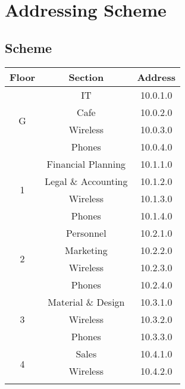 \chapter{Addressing Scheme}
\section{Scheme}
\begin{table}[H]
    \centering
    \begin{tabular}{|c|cc|}
    \hline
    Floor              & \multicolumn{1}{c|}{Section} & Address  \\ \hline
    \multirow{4}{*}{G} & IT                           & 10.0.1.0 \\ \cline{2-3} 
                       & Cafe                         & 10.0.2.0 \\ \cline{2-3} 
                       & Wireless                     & 10.0.3.0 \\ \cline{2-3} 
                       & Phones                       & 10.0.4.0 \\ \hline
    \multirow{4}{*}{1} & Financial Planning           & 10.1.1.0 \\ \cline{2-3} 
                       & Legal \& Accounting          & 10.1.2.0 \\ \cline{2-3} 
                       & Wireless                     & 10.1.3.0 \\ \cline{2-3} 
                       & Phones                       & 10.1.4.0 \\ \hline
    \multirow{4}{*}{2} & Personnel                    & 10.2.1.0 \\ \cline{2-3} 
                       & Marketing                    & 10.2.2.0 \\ \cline{2-3} 
                       & Wireless                     & 10.2.3.0 \\ \cline{2-3} 
                       & Phones                       & 10.2.4.0 \\ \hline
    \multirow{3}{*}{3} & Material \& Design           & 10.3.1.0 \\ \cline{2-3} 
                       & Wireless                     & 10.3.2.0 \\ \cline{2-3} 
                       & Phones                       & 10.3.3.0 \\ \hline
    \multirow{3}{*}{4} & Sales                        & 10.4.1.0 \\ \cline{2-3} 
                       & Wireless                     & 10.4.2.0 \\ \cline{2-3} 

\end{tabular}
\end{table}
